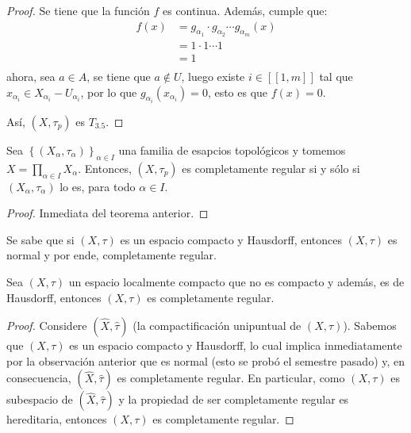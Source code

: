 \documentclass[12pt]{report}
\newcounter{it}
\theoremstyle{largebreak}
\newcommand\natint[1]{\ensuremath{\left[\!\left[ #1\right]\!\right]}}
\begin{document}
\begin{proof}
        Se tiene que la función $f$ es continua. Además, cumple que:
        \begin{equation*}
            \begin{split}
                f(x)&=g_{\alpha_1}\cdot g_{\alpha_2}\cdots g_{\alpha_m}(x)\\
                &=1\cdot 1\cdots 1\\
                &=1\\
            \end{split}
        \end{equation*}
        ahora, sea $a\in A$, se tiene que $a\notin U$, luego existe $i\in\natint{1,m}$ tal que $x_{\alpha_i}\in X_{\alpha_i}-U_{\alpha_i}$, por lo que $g_{\alpha_i}(x_{\alpha_i})=0$, esto es que $f(x)=0$.

        Así, $(X,\tau_p)$ es $T_{3.5}$.
    \end{proof}

    \begin{cor}
        Sea $\left\{(X_\alpha,\tau_\alpha) \right\}_{ \alpha\in I}$ una familia de esapcios topológicos y tomemos $X=\prod_{ \alpha\in I}X_\alpha$. Entonces, $(X,\tau_p)$ es completamente regular si y sólo si $(X_\alpha,\tau_\alpha)$ lo es, para todo $\alpha\in I$.
    \end{cor}

    \begin{proof}
        Inmediata del teorema anterior.
    \end{proof}

    \begin{obs}
        Se sabe que si $(X,\tau)$ es un espacio compacto y Hausdorff, entonces $(X,\tau)$ es normal y por ende, completamente regular.
    \end{obs}

    \begin{propo}
        Sea $(X,\tau)$ un espacio localmente compacto que no es compacto y además, es de Hausdorff, entonces $(X,\tau)$ es completamente regular.
    \end{propo}

    \begin{proof}
        Considere $(\hat{X},\hat{\tau})$ (la compactificación unipuntual de $(X,\tau)$). Sabemos que $(X,\tau)$ es un espacio compacto y Hausdorff, lo cual implica inmediatamente por la observación anterior que es normal (esto se probó el semestre pasado) y, en consecuencia, $(\hat{X},\hat{\tau})$ es completamente regular. En particular, como $(X,\tau)$ es subespacio de $(\hat{X},\hat{\tau})$ y la propiedad de ser completamente regular es hereditaria, entonces $(X,\tau)$ es completamente regular.
    \end{proof}
\end{document}
